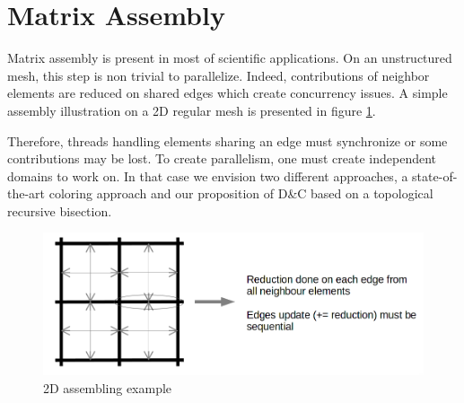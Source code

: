 \documentclass{IOS-Book-Article}
\begin{document}
\section{Matrix Assembly}





Matrix assembly is present in most of scientific applications. On an unstructured mesh, this step is non trivial to parallelize.
Indeed, contributions of neighbor elements are reduced on shared edges which create concurrency issues.
A simple assembly illustration on a 2D regular mesh is presented in figure \ref{fig:2Dasm}.

Therefore, threads handling elements sharing an edge must synchronize or some contributions may be lost. To create parallelism, one must create independent domains to work on.
In that case we envision two different approaches, a state-of-the-art coloring approach and our proposition of D\&C based on a topological recursive bisection.
\begin{figure}[htp]
 \centering
 \includegraphics[scale=0.2]{2D_assembly.png}
 \caption{2D assembling example}
 \label{fig:2Dasm}
\end{figure}
\end{document}
